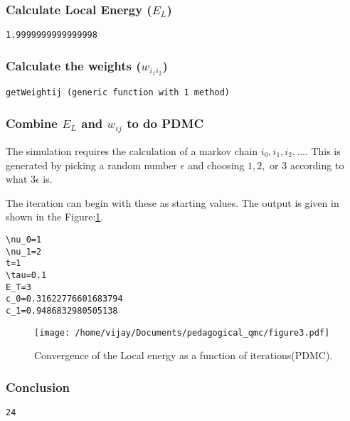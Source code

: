 \documentclass[11pt]{article}
\begin{document}
\subsubsection{Calculate Local Energy (\(E_L\))}
\label{sec:org9ae6f41}

\begin{verbatim}
1.9999999999999998
\end{verbatim}

\subsubsection{Calculate the weights (\(w_{i_1 i_2}\))}
\label{sec:org7b3bc0a}

\begin{verbatim}
getWeightij (generic function with 1 method)
\end{verbatim}

\subsubsection{Combine \(E_L\) and \(w_{ij}\) to do PDMC}
\label{sec:orgd33ca29}

The simulation requires the calculation of a markov chain \(i_0, i_1, i_2,
\dots\). This is generated by picking a random number \(\epsilon\) and choosing
\(1, 2,\) or \(3\) according to what \(3 \epsilon\) is.

The iteration can begin with these as starting values. The output is given in
shown in the Figure:\ref{figure3}.

\begin{verbatim}
\nu_0=1
\nu_1=2
t=1
\tau=0.1
E_T=3
c_0=0.31622776601683794
c_1=0.9486832980505138
\end{verbatim}

\begin{figure}[htbp]
\centering
\texttt{[image: /home/vijay/Documents/pedagogical\_qmc/figure3.pdf]}
\caption{\label{figure3}Convergence of the Local energy as a function of iterations(PDMC).}
\end{figure}

\subsubsection{Conclusion}
\label{sec:org0c84c7e}

\begin{verbatim}
24
\end{verbatim}
\end{document}
